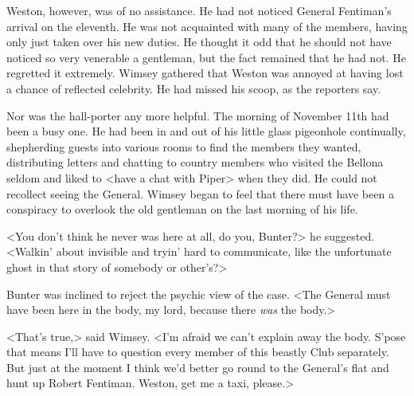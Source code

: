 Weston, however, was of no assistance. He had not noticed General Fentiman's arrival on the eleventh. He was not acquainted with many of the members, having only just taken over his new duties. He thought it odd that he should not have noticed so very venerable a gentleman, but the fact remained that he had not. He regretted it extremely. Wimsey gathered that Weston was annoyed at having lost a chance of reflected celebrity. He had missed his scoop, as the reporters say.

Nor was the hall-porter any more helpful. The morning of November  11th had been a busy one. He had been in and out of his little glass pigeonhole continually, shepherding guests into various rooms to find the members they wanted, distributing letters and chatting to country members who visited the Bellona seldom and liked to <have a chat with Piper> when they did. He could not recollect seeing the General. Wimsey began to feel that there must have been a conspiracy to overlook the old gentleman on the last morning of his life.

<You don't think he never was here at all, do you, Bunter?> he suggested. <Walkin' about invisible and tryin' hard to communicate, like the unfortunate ghost in that story of somebody or other's?>

Bunter was inclined to reject the psychic view of the case. <The General must have been here in the body, my lord, because there \emph{was} the body.>

<That's true,> said Wimsey. <I'm afraid we can't explain away the body. S'pose that means I'll have to question every member of this beastly Club separately. But just at the moment I think we'd better go round to the General's flat and hunt up Robert Fentiman. Weston, get me a taxi, please.>